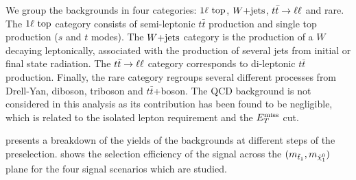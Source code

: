         We group the backgrounds in four categories: $1\ell~\text{top}$, $\text{$W$+jets}$, $t\bar{t} \rightarrow \ell \ell$
        and rare. The $1\ell~\text{top}$ category consists of semi-leptonic $t\bar{t}$
        production and single top production ($s$ and $t$ modes). The $\text{$W$+jets}$
        category is the production of a $W$ decaying leptonically, associated with the
        production of several jets from initial or final state radiation. The $t\bar{t} \rightarrow \ell \ell$
        category corresponds to di-leptonic $t\bar{t}$ production. Finally, the rare
        category regroups several different processes from Drell-Yan, diboson, triboson and
        $t\bar{t}$+boson. The QCD background is not considered in this analysis as its
        contribution has been found to be negligible, which is related to the
        isolated lepton requirement and the $E_T^\text{miss}$ cut.

         presents a breakdown of the yields of the backgrounds
        at different steps of the preselection.  shows
        the selection efficiency of the signal across the $(m_{\tilde{t}_1}, m_{\tilde{\chi}_1^0})$
        plane for the four signal scenarios which are studied.

